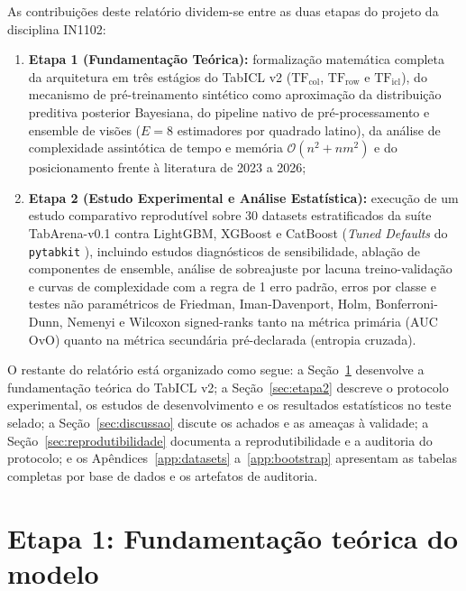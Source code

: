 \documentclass[11pt,a4paper]{article}
\begin{document}
As contribuições deste relatório dividem-se entre as duas etapas do projeto da disciplina IN1102:
\begin{enumerate}[leftmargin=2em]
    \item \textbf{Etapa 1 (Fundamentação Teórica):} formalização matemática completa da arquitetura em três estágios do TabICL v2 ($\mathrm{TF}_{\mathrm{col}}$, $\mathrm{TF}_{\mathrm{row}}$ e $\mathrm{TF}_{\mathrm{icl}}$), do mecanismo de pré-treinamento sintético como aproximação da distribuição preditiva posterior Bayesiana, do pipeline nativo de pré-processamento e ensemble de visões ($E = 8$ estimadores por quadrado latino), da análise de complexidade assintótica de tempo e memória $\mathcal{O}(n^2 + n m^2)$ e do posicionamento frente à literatura de 2023 a 2026;
    \item \textbf{Etapa 2 (Estudo Experimental e Análise Estatística):} execução de um estudo comparativo reprodutível sobre 30 datasets estratificados da suíte TabArena-v0.1 \cite{erickson2025tabarena} contra LightGBM, XGBoost e CatBoost (\emph{Tuned Defaults} do \texttt{pytabkit} \cite{holzmuller2024better}), incluindo estudos diagnósticos de sensibilidade, ablação de componentes de ensemble, análise de sobreajuste por lacuna treino-validação e curvas de complexidade com a regra de 1 erro padrão, erros por classe e testes não paramétricos de Friedman, Iman-Davenport, Holm, Bonferroni-Dunn, Nemenyi e Wilcoxon signed-ranks \cite{demsar2006statistical} tanto na métrica primária (AUC OvO) quanto na métrica secundária pré-declarada (entropia cruzada).
\end{enumerate}

O restante do relatório está organizado como segue: a Seção~\ref{sec:etapa1} desenvolve a fundamentação teórica do TabICL v2; a Seção~\ref{sec:etapa2} descreve o protocolo experimental, os estudos de desenvolvimento e os resultados estatísticos no teste selado; a Seção~\ref{sec:discussao} discute os achados e as ameaças à validade; a Seção~\ref{sec:reprodutibilidade} documenta a reprodutibilidade e a auditoria do protocolo; e os Apêndices~\ref{app:datasets} a~\ref{app:bootstrap} apresentam as tabelas completas por base de dados e os artefatos de auditoria.

\section{Etapa 1: Fundamentação teórica do modelo}
\label{sec:etapa1}
\end{document}
